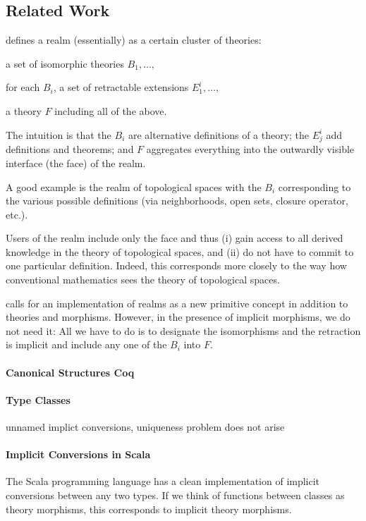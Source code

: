 \subsection{Related Work}


\cite{realms} defines a realm (essentially) as a certain cluster of theories:
\begin{compactitem}
\item a set of isomorphic theories $B_1,\ldots,$
\item for each $B_i$, a set of retractable extensions $E^i_1,\ldots,$
\item a theory $F$ including all of the above.
\end{compactitem}
The intuition is that the $B_i$ are alternative definitions of a theory; the $E^i_j$ add definitions and theorems; and $F$ aggregates everything into the outwardly visible interface (the face) of the realm.

A good example is the realm of topological spaces with the $B_i$ corresponding to the various possible definitions (via neighborhoods, open sets, closure operator, etc.).

Users of the realm include only the face and thus (i) gain access to all derived knowledge in the theory of topological spaces, and (ii) do not have to commit to one particular definition.
Indeed, this corresponds more closely to the way how conventional mathematics sees the theory of topological spaces.

\cite{realms} calls for an implementation of realms as a new primitive concept in addition to theories and morphisms.
However, in the presence of implicit morphisms, we do not need it: All we have to do is to designate the isomorphisms and the retraction is implicit and include any one of the $B_i$ into $F$.

\paragraph{Canonical Structures Coq}
\cite{gonthier_packaging}

\paragraph{Type Classes}
unnamed implict conversions, uniqueness problem does not arise

\paragraph{Implicit Conversions in Scala}
The Scala programming language \cite{scala} has a clean implementation of implicit conversions between any two types.
If we think of functions between classes as theory morphisms, this corresponds to implicit theory morphisms.

